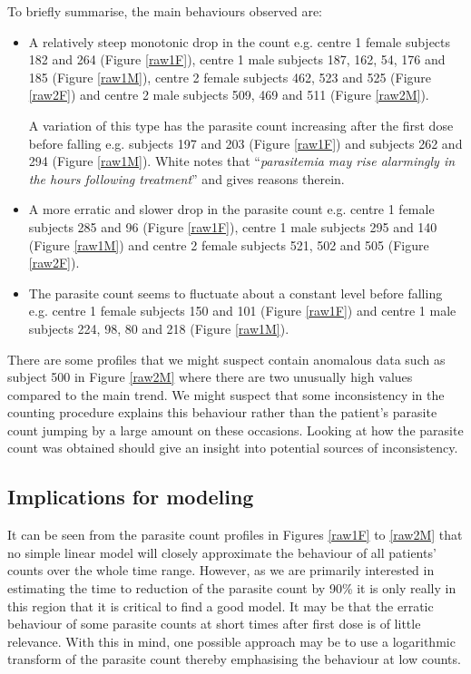 To briefly summarise, the main behaviours observed are:
\begin{itemize}
\item A relatively steep monotonic drop in the count e.g. centre 1 female subjects 182 and 264 (Figure \ref{raw1F}), centre 1 male subjects 187, 162, 54, 176 and 185 (Figure \ref{raw1M}), centre 2 female subjects 462, 523 and 525 (Figure \ref{raw2F}) and centre 2 male subjects 509, 469 and 511 (Figure \ref{raw2M}).

A variation of this type has the parasite count increasing after the first dose before falling e.g. subjects 197 and 203 (Figure \ref{raw1F}) and subjects 262 and 294 (Figure \ref{raw1M}). White\cite{white} notes that ``\textit{parasitemia may rise alarmingly in the hours following treatment}'' and gives reasons therein.
\item A more erratic and slower drop in the parasite count e.g. centre 1 female subjects 285 and 96 (Figure \ref{raw1F}), centre 1 male subjects 295 and 140 (Figure \ref{raw1M}) and centre 2 female subjects 521, 502 and 505 (Figure \ref{raw2F}). 
\item The parasite count seems to fluctuate about a constant level before falling e.g. centre 1 female subjects 150 and 101 (Figure \ref{raw1F}) and centre 1 male subjects 224, 98, 80 and 218 (Figure \ref{raw1M}). 
\end{itemize}
There are some profiles that we might suspect contain anomalous data such as subject 500 in Figure \ref{raw2M} where there are two unusually high values compared to the main trend. We might suspect that some inconsistency in the counting procedure explains this behaviour rather than the patient's parasite count jumping by a large amount on these occasions. Looking at how the parasite count was obtained should give an insight into potential sources of inconsistency.
\subsection{Implications for modeling}
It can be seen from the parasite count profiles in Figures \ref{raw1F} to \ref{raw2M} that no simple linear model will closely approximate the behaviour of all patients' counts over the whole time range. However, as we are primarily interested in estimating the time to reduction of the parasite count by 90\% it is only really in this region that it is critical to find a good model. It may be that the erratic behaviour of some parasite counts at short times after first dose is of little relevance. With this in mind, one possible approach may be to use a logarithmic transform of the parasite count thereby emphasising the behaviour at low counts.
\clearpage
